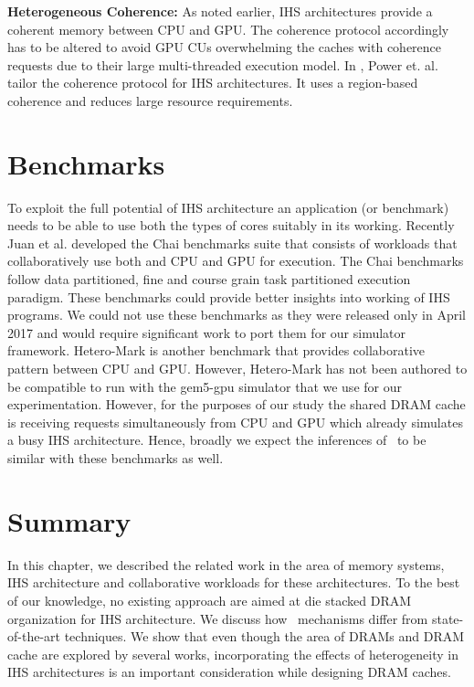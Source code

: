 \par \textbf{Heterogeneous Coherence:} As noted earlier, IHS architectures provide a coherent memory between CPU and GPU. The coherence protocol accordingly has to be altered to avoid GPU CUs overwhelming the caches with coherence requests due to their large multi-threaded execution model. In \cite{hsc-coherence}, Power et. al. tailor the coherence protocol for IHS architectures. It uses a region-based coherence and reduces large resource requirements.

\section{Benchmarks} \label{related-work-benchmarks}
To exploit the full potential of IHS architecture an application (or benchmark) needs to be able to use both the types of cores suitably in its working. Recently Juan et al. developed the Chai benchmarks suite \cite{chai} that consists of workloads that collaboratively use both and CPU and GPU for execution. The Chai benchmarks follow data partitioned, fine and course grain task partitioned execution paradigm. These benchmarks could provide better insights into working of IHS programs. We could not use these benchmarks as they were released only in April 2017 and would require significant work to port them for our simulator framework. Hetero-Mark \cite{hetero-mark} is another benchmark that provides collaborative pattern between CPU and GPU. However, Hetero-Mark has not been authored to be compatible to run with the gem5-gpu simulator that we use for our experimentation. However, for the purposes of our study the shared DRAM cache is receiving requests simultaneously from CPU and GPU which already simulates a busy IHS architecture.  Hence, broadly we expect the inferences of \cachename\ to be similar with these benchmarks as well.

\section{Summary}
In this chapter, we described the related work in the area of memory systems, IHS architecture and collaborative workloads for these architectures. To the best of our knowledge, no existing approach are aimed at die stacked DRAM organization for IHS architecture. We discuss how \cachename\ mechanisms differ from state-of-the-art techniques. We show that even though the area of DRAMs and DRAM cache are explored by several works, incorporating the effects of heterogeneity in IHS architectures is an important consideration while designing DRAM caches.